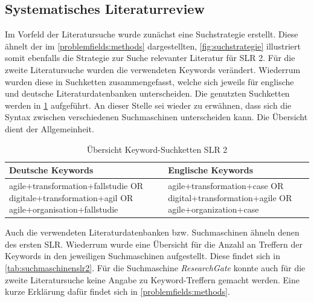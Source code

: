 \subsection{Systematisches Literaturreview}

Im Vorfeld der Literatursuche wurde zunächst eine Suchstrategie erstellt. Diese ähnelt der im \ref{problemfields:methods} dargestellten, \ref{fig:suchstrategie} illustriert somit ebenfalls die Strategie zur Suche relevanter Literatur für SLR 2. Für die zweite Literatursuche wurden die verwendeten Keywords verändert. Wiederrum wurden diese in Suchketten zusammengefasst, welche sich jeweils für englische und deutsche Literaturdatenbanken unterscheiden. Die genutzten Suchketten werden in \ref{tab:keywordsslr2} aufgeführt. An dieser Stelle sei wieder zu erwähnen, dass sich die Syntax zwischen verschiedenen Suchmaschinen unterscheiden kann. Die Übersicht dient der Allgemeinheit.

\begin{table}[ht]
	\centering
	\caption{Übersicht Keyword-Suchketten SLR 2}
	\begin{tabular}{|p{7cm}|p{7cm}|}
		\hline
		\textbf{Deutsche Keywords}& \textbf{Englische Keywords} \\
		\hline
		agile+transformation+fallstudie OR digitale+transformation+agil OR agile+organisation+fallstudie   & agile+transformation+case OR digital+transformation+agile OR agile+organization+case \\
		\hline
	\end{tabular}
	\label{tab:keywordsslr2}
\end{table}

Auch die verwendeten Literaturdatenbanken bzw. Suchmaschinen ähneln denen des ersten SLR. Wiederrum wurde eine Übersicht für die Anzahl an Treffern der Keywords in den jeweiligen Suchmaschinen aufgestellt. Diese findet sich in \ref{tab:suchmaschinenslr2}. Für die Suchmaschine \textit{ResearchGate} konnte auch für die zweite Literatursuche keine Angabe zu Keyword-Treffern gemacht werden. Eine kurze Erklärung dafür findet sich in \ref{problemfields:methods}.

